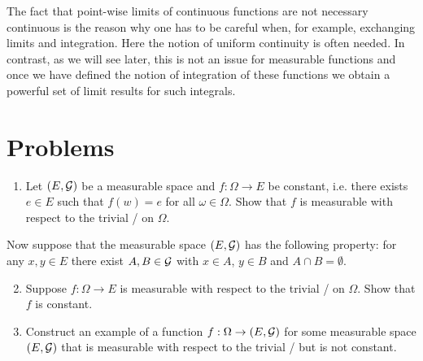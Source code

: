 The fact that point-wise limits of continuous functions are not necessary continuous is the reason why one has to be careful when, for example, exchanging limits and integration. Here the notion of uniform continuity is often needed. In contrast, as we will see later, this is not an issue for measurable functions and once we have defined the notion of integration of these functions we obtain a powerful set of limit results for such integrals.

\section{Problems}

\begin{problem}
\hfil
\begin{enumerate}[label=(\alph*)]
\item Let $(E, \mathcal G)$ be a measurable space and $f : \Omega \to E$ be constant, i.e. there exists $e \in E$ such that $f(w) = e$ for all $\omega \in \Omega$. Show that $f$ is measurable with respect to the trivial \sigalg/ on $\Omega$.  
\end{enumerate}

Now suppose that the measurable space $(E, \mathcal G)$ has the following property: for any $x,y\in E$ there exist $A, B \in \mathcal G$ with $x \in A$, $y \in B$ and $A \cap B = \emptyset$.

\begin{enumerate}[label=(\alph*)]
\setcounter{enumi}{1}
\item Suppose $f : \Omega \to E$ is measurable with respect to the trivial \sigalg/ on $\Omega$. Show that $f$ is constant.
\item Construct an example of a function $f : \Omega \to (E,\mathcal G)$ for some measurable space $(E, \mathcal G)$ that is measurable with respect to the trivial \sigalg/ but is not constant.
\end{enumerate}
\end{problem}


